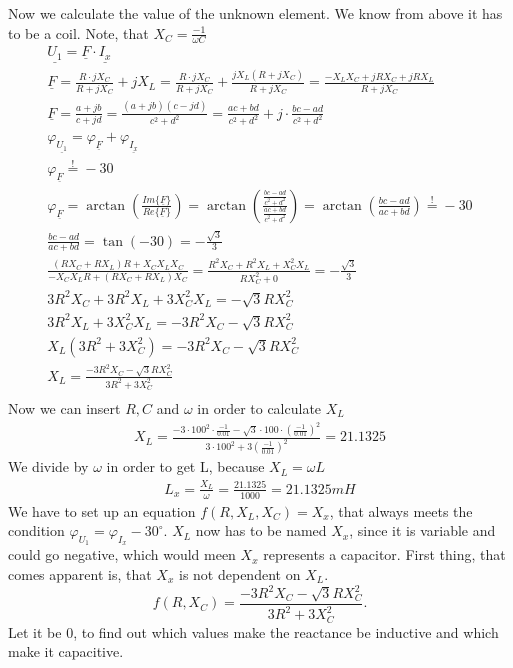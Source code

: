 \documentclass[a4paper]{article}
\begin{document}
Now we calculate the value of the unknown element. We know from above it has to be a coil.
Note, that $X_C = \frac{-1}{\omega C}$
\begin{align*}
	\underline{U_1} = \underline{F} \cdot \underline{I_x}\\
	\underline{F} = \frac{R \cdot jX_C}{R + jX_C} + jX_L =
	\frac{R \cdot jX_C}{R + jX_C} + \frac{jX_L(R+jX_C)}{R + jX_C} = \frac{-X_LX_C + jRX_C + jRX_L}{R + jX_C}\\
	\underline{F} = \frac{a+jb}{c+jd} = \frac{(a+jb)(c-jd)}{c^2+d^2} = \frac{ac+bd}{c^2+d^2} + j\cdot\frac{bc-ad}{c^2+d^2}\\
	\varphi_{\underline{U_1}} = \varphi_{\underline{F}} + \varphi_{\underline{I_x}}\\
	\varphi_{\underline{F}} \overset{!}{=} -30\\
	\varphi_{\underline{F}} = \arctan \left(\frac{Im\{\underline{F}\}}{Re\{\underline{F}\}} \right) =
	\arctan \left(\frac{\frac{bc-ad}{c^2+d^2}}{\frac{ac+bd}{c^2+d^2}} \right) =
	\arctan \left(\frac{bc-ad}{ac+bd} \right) \overset{!}{=} -30\\
	\frac{bc-ad}{ac+bd} = \tan(-30) = -\frac{\sqrt{3}}{3}\\
	\frac{(RX_C+RX_L)R + X_CX_LX_C}{-X_CX_LR + (RX_C + RX_L)X_C} = 
	\frac{R^2X_C + R^2X_L + X_C^2X_L}{RX_C^2 + 0} = -\frac{\sqrt{3}}{3}\\
	3R^2X_C + 3R^2X_L + 3X_C^2X_L = -\sqrt{3}RX_C^2\\
	3R^2X_L + 3X_C^2X_L = -3R^2X_C -\sqrt{3}RX_C^2\\
	X_L(3R^2 + 3X_C^2) = -3R^2X_C -\sqrt{3}RX_C^2\\
	X_L = \frac{-3R^2X_C -\sqrt{3}RX_C^2}{3R^2 + 3X_C^2}\\
\end{align*}
Now we can insert $R, C$ and $\omega$ in order to calculate $X_L$
\begin{align*}
	X_L = \frac{-3 \cdot 100^2 \cdot \frac{-1}{0.01} -\sqrt{3} \cdot 100 \cdot \left(\frac{-1}{0.01}\right)^2}
	{3\cdot 100^2 + 3\left(\frac{-1}{0.01}\right)^2} = 21.1325
\end{align*}
We divide by $\omega$ in order to get L, because $X_L = \omega L$
\begin{align*}
	L_x = \frac{X_L}{\omega} = \frac{21.1325}{1000} = 21.1325mH
\end{align*}
\newpage
\clearpage
We have to set up an equation $f(R, X_{L}, X_{C}) = X_x$, that always meets the condition
$\varphi_{U_{1}} = \varphi_{I_{x}} - 30^{\circ}$. $X_L$ now has to be named  $X_{x}$, since it is
variable and could go negative, which would meen $X_{x}$ represents a capacitor. First thing, that
comes apparent is, that $X_{x}$ is not dependent on $X_{L}$.
\[
  f(R, X_{C}) =  \frac{-3R^2X_C -\sqrt{3}RX_C^2}{3R^2 + 3X_C^2} 
.\] 
Let it be $0$, to find out which values make the reactance be inductive and which make it
capacitive. 
\end{document}
